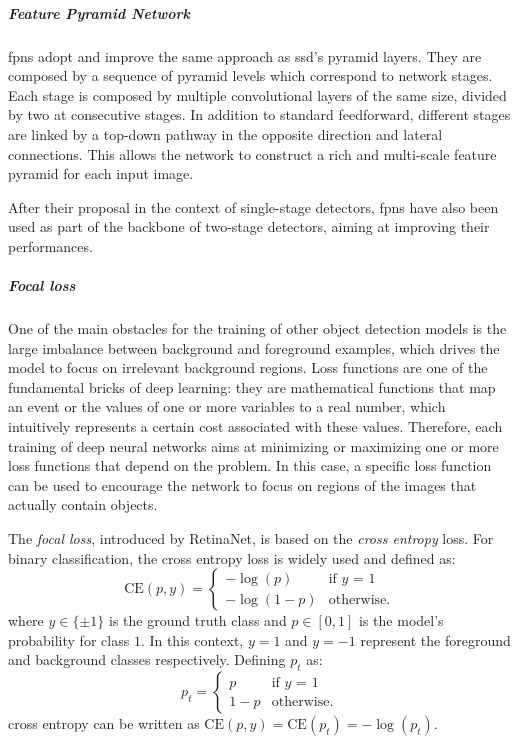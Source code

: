 \documentclass[%
    corpo=12pt,
    twoside,
    stile=classica,   
    tipotesi=magistrale,
    evenboxes,
    english,
	numerazioneromana,
]{toptesi}
\begin{document}
\subparagraph{Feature Pyramid Network}
\glspl{fpn}\cite{lin2017feature} adopt and improve the same approach as \acrshort{ssd}'s pyramid layers. They are composed by a sequence of pyramid levels which correspond to network stages. Each stage is composed by multiple convolutional layers of the same size, divided by two at consecutive stages. In addition to standard feedforward, different stages are linked by a top-down pathway in the opposite direction and lateral connections. This allows the network to construct a rich and multi-scale feature pyramid for each input image.

After their proposal in the context of single-stage detectors, \glspl{fpn} have also been used as part of the backbone of two-stage detectors, aiming at improving their performances.

\subparagraph{Focal loss}
One of the main obstacles for the training of other object detection models is the large imbalance between background and foreground examples, which drives the model to focus on irrelevant background regions. Loss functions are one of the fundamental bricks of deep learning: they are mathematical functions that map an event or the values of one or more variables to a real number, which intuitively represents a certain cost associated with these values. Therefore, each training of deep neural networks aims at minimizing or maximizing one or more loss functions that depend on the problem. In this case, a specific loss function can be used to encourage the network to focus on regions of the images that actually contain objects.

\bigskip
The \textit{focal loss}, introduced by RetinaNet, is based on the \textit{cross entropy} loss. For binary classification, the cross entropy loss is widely used and defined as:
\begin{equation}
	\text{CE}(p,y) = \begin{cases}
		-\log(p) & \text{if $y$ = 1}\\
		-\log(1-p) & \text{otherwise.}
	\end{cases}
\end{equation}
where $y\in \{\pm 1\}$ is the ground truth class and $p\in\left[0,1\right]$ is the model's probability for class $1$. In this context, $y=1$ and $y=-1$ represent the foreground and background classes respectively. Defining $p_t$ as:
\begin{equation}
	p_t = \begin{cases}
		p & \text{if $y$ = 1}\\
		1-p & \text{otherwise.}
	\end{cases}
\end{equation}
cross entropy can be written as $\text{CE}(p,y) = \text{CE}(p_t) = -\log(p_t)$.
\end{document}
